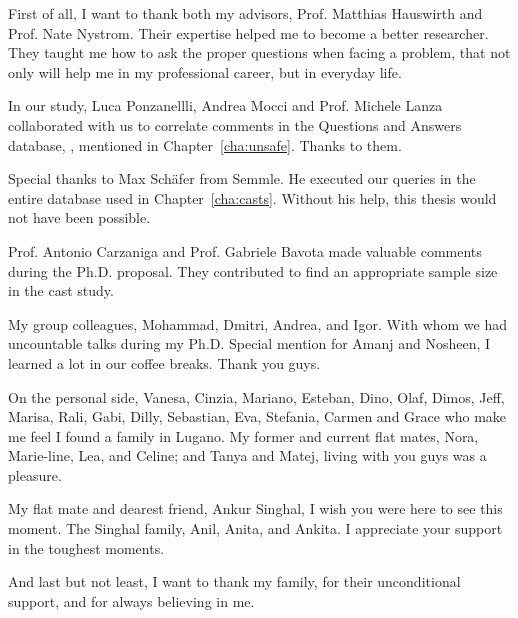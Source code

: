 \begin{acknowledgements}
First of all, I want to thank both my advisors,
Prof. Matthias Hauswirth and Prof. Nate Nystrom.
Their expertise helped me to become a better researcher.
They taught me how to ask the proper questions when facing a problem,
that not only will help me in my professional career,
but in everyday life.

In our \unsafe{} study,
Luca Ponzanellli, Andrea Mocci and Prof. Michele Lanza
collaborated with us to correlate \unsafe{} 
comments in the Questions and Answers database, \stackoverflow{}, mentioned in Chapter~\ref{cha:unsafe}.
Thanks to them.

Special thanks to Max Sch\"afer from Semmle.
He executed our \ql{} queries in the entire \lgtm{} database used in Chapter~\ref{cha:casts}.
Without his help, this thesis would not have been possible.

Prof. Antonio Carzaniga and Prof. Gabriele Bavota made valuable comments during the Ph.D. proposal.
They contributed to find an appropriate sample size in the cast study.

My group colleagues, Mohammad, Dmitri, Andrea, and Igor.
With whom we had uncountable talks during my Ph.D.
Special mention for Amanj and Nosheen,
I learned a lot in our coffee breaks.
Thank you guys.

On the personal side,
Vanesa, Cinzia, Mariano, Esteban, Dino, Olaf, Dimos, Jeff, Marisa, Rali, Gabi, Dilly, Sebastian, Eva, Stefania, Carmen and Grace 
who make me feel I found a family in Lugano.
My former and current flat mates, Nora, Marie-line, Lea, and Celine;
and Tanya and Matej, living with you guys was a pleasure.

My flat mate and dearest friend, Ankur Singhal,
I wish you were here to see this moment.
The Singhal family, Anil, Anita, and Ankita.
I appreciate your support in the toughest moments.

And last but not least,
I want to thank my family, for their unconditional support,
and for always believing in me.

\end{acknowledgements}
